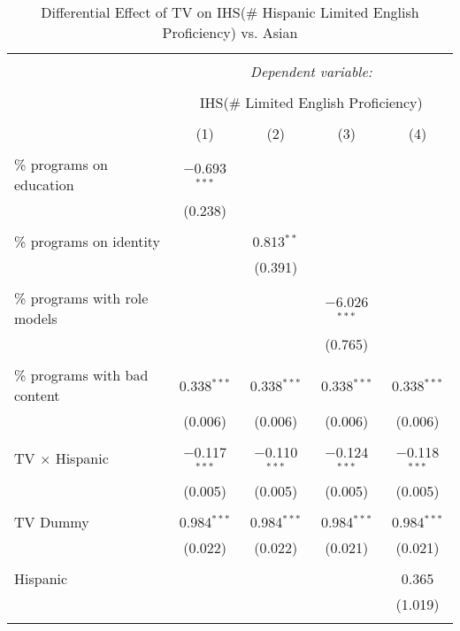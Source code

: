 
\begin{table}[!htbp] \centering 
  \caption{Differential Effect of TV on IHS(\# Hispanic Limited English Proficiency) vs. Asian} 
  \label{} 
\begin{tabular}{@{\extracolsep{-2pt}}lcccc} 
\\[-1.8ex]\hline 
\hline \\[-1.8ex] 
 & \multicolumn{4}{c}{\textit{Dependent variable:}} \\ 
\cline{2-5} 
\\[-1.8ex] & \multicolumn{4}{c}{IHS(\# Limited English Proficiency)} \\ 
\\[-1.8ex] & (1) & (2) & (3) & (4)\\ 
\hline \\[-1.8ex] 
 \% programs on education & $-$0.693$^{***}$ &  &  &  \\ 
  & (0.238) &  &  &  \\ 
  & & & & \\ 
 \% programs on identity &  & 0.813$^{**}$ &  &  \\ 
  &  & (0.391) &  &  \\ 
  & & & & \\ 
 \% programs with role models &  &  & $-$6.026$^{***}$ &  \\ 
  &  &  & (0.765) &  \\ 
  & & & & \\ 
 \% programs with bad content & 0.338$^{***}$ & 0.338$^{***}$ & 0.338$^{***}$ & 0.338$^{***}$ \\ 
  & (0.006) & (0.006) & (0.006) & (0.006) \\ 
  & & & & \\ 
 TV $\times$ Hispanic & $-$0.117$^{***}$ & $-$0.110$^{***}$ & $-$0.124$^{***}$ & $-$0.118$^{***}$ \\ 
  & (0.005) & (0.005) & (0.005) & (0.005) \\ 
  & & & & \\ 
 TV Dummy & 0.984$^{***}$ & 0.984$^{***}$ & 0.984$^{***}$ & 0.984$^{***}$ \\ 
  & (0.022) & (0.022) & (0.021) & (0.021) \\ 
  & & & & \\ 
 Hispanic &  &  &  & 0.365 \\ 
  &  &  &  & (1.019) \\ 
  & & & & \\ 

\end{tabular}
\end{table}
